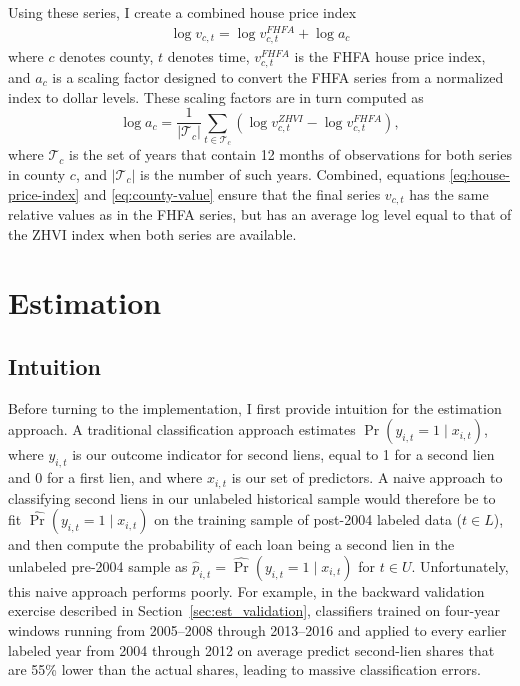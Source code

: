 \documentclass[letterpaper,12pt,usenames,dvipsnames]{article}
\newcommand{\pbrac}[1]{\left( #1 \right)}
\theoremstyle{definition}
\begin{document}
Using these series, I create a combined house price index
\begin{align}
	\label{eq:house-price-index}
	\log v_{c,t} = \log v^{FHFA}_{c,t} + \log a_c
\end{align}
where $c$ denotes county, $t$ denotes time, $v^{FHFA}_{c,t}$ is the FHFA house price index, and $a_c$ is a scaling factor designed to convert the FHFA series from a normalized index to dollar levels. These scaling factors are in turn computed as
\begin{equation}
	\log a_c = \frac{1}{|\mathcal{T}_c|} \sum_{t \in \mathcal{T}_c}
	\pbrac{\log v^{ZHVI}_{c,t} - \log v^{FHFA}_{c,t}},
	\label{eq:county-value}
\end{equation}
where $\mathcal{T}_c$ is the set of years that contain 12 months of observations for both series in county $c$, and $|\mathcal{T}_c|$ is the number of such years. Combined, equations \eqref{eq:house-price-index} and \eqref{eq:county-value} ensure that the final series $v_{c,t}$ has the same relative values as in the FHFA series, but has an average log level equal to that of the ZHVI index when both series are available.

\section{Estimation}\label{sec:estimation}


\subsection{Intuition}
\label{sec:intuition}

Before turning to the implementation, I first provide intuition for the estimation approach. A traditional classification approach estimates $\Pr(y_{i,t} = 1 \mid x_{i,t})$, where $y_{i,t}$ is our outcome indicator for second liens, equal to 1 for a second lien and 0 for a first lien, and where $x_{i,t}$ is our set of predictors. A naive approach to classifying second liens in our unlabeled historical sample would therefore be to fit $\widehat{\Pr}(y_{i,t} = 1 \mid x_{i,t})$ on the training sample of post-2004 labeled data ($t \in L$), and then compute the probability of each loan being a second lien in the unlabeled pre-2004 sample as $\hat{p}_{i,t} = \widehat{\Pr}(y_{i,t} = 1 \mid x_{i,t})$ for $t \in U$.
%
Unfortunately, this naive approach performs poorly. For example, in the backward validation exercise described in
Section~\ref{sec:est_validation}, classifiers trained on four-year windows running from
2005--2008 through 2013--2016 and applied to every earlier labeled year from 2004 through 2012
on average predict second-lien shares that are 55\% lower than the actual shares, leading to massive classification errors.
\end{document}
